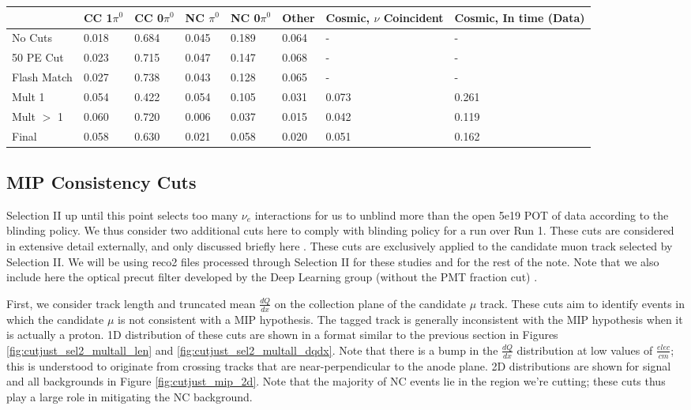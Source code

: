 \begin{table*}
\centering
{}
 \begin{tabular}{| l | l | l |l|l|l|l|l|}
 \hline
 & CC 1$\pi^0$ & CC 0$\pi^0$ & NC $\pi^0$ & NC 0$\pi^0$ & Other & Cosmic, $\nu$ Coincident & Cosmic, In time (Data) \\ [0.1ex] \hline
No Cuts & 0.018 & 0.684 & 0.045 & 0.189 & 0.064 & - & -\\ 
50 PE Cut & 0.023 & 0.715 & 0.047 & 0.147 & 0.068 & -& - \\
Flash Match & 0.027 & 0.738 & 0.043 & 0.128 & 0.065 & -&- \\ \hline
Mult 1 & 0.054 & 0.422 & 0.054 & 0.105 & 0.031 & 0.073 & 0.261 \\ 
Mult $>$ 1 & 0.060 & 0.720 & 0.006 & 0.037 & 0.015 & 0.042 & 0.119 \\ 
Final & 0.058 & 0.630 & 0.021 & 0.058 & 0.020 & 0.051 & 0.162 \\ \hline
\end{tabular}
\end{table*}


\clearpage
\subsection{ MIP Consistency Cuts}
Selection II up until this point selects too many $\nu_e$ interactions for us to unblind more than the open 5e19 POT of data according to the blinding policy.  We thus consider two additional cuts here to comply with blinding policy for a run over Run 1.  These cuts are considered in extensive detail externally, and only discussed briefly here \cite{bib:jz_unblinding_note}.  These cuts are exclusively applied to the candidate muon track selected by Selection II.  We will be using reco2 files processed through Selection II for these studies and for the rest of the note.  Note that we also include here the optical precut filter developed by the Deep Learning group (without the PMT fraction cut) \cite{bib:jarrett_opticalprecut}.
\par First, we consider track length and truncated mean $\frac{dQ}{dx}$ on the collection plane of the candidate $\mu$ track. These cuts aim to identify events in which the candidate $\mu$ is not consistent with a MIP hypothesis. The tagged track is generally inconsistent with the MIP hypothesis when it is actually a proton. 1D distribution of these cuts are shown in a format similar to the previous section in Figures \ref{fig:cutjust_sel2_multall_len} and \ref{fig:cutjust_sel2_multall_dqdx}. Note that there is a bump in the $\frac{dQ}{dx}$ distribution at low values of $\frac{elec}{cm}$; this is understood to originate from crossing tracks that are near-perpendicular to the anode plane.  2D distributions are shown for signal and all backgrounds in Figure \ref{fig:cutjust_mip_2d}.  Note that the majority of NC events lie in the region we're cutting; these cuts thus play a large role in mitigating the NC background.

